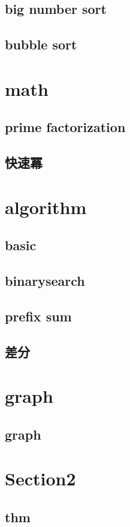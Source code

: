     \subsection{big number sort}
        
    \subsection{bubble sort}
        

\section{math}
        \subsection{prime factorization}
                
        \subsection{快速冪}
            

\section{algorithm}
    \subsection{basic}
        
    \subsection{binarysearch}
        
    \subsection{prefix sum}
        
    \subsection{差分}
        



\section{graph}
    \subsection{graph}
        


\section{Section2}
    \subsection{thm}
        